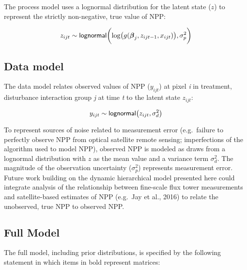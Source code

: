 \documentclass[
]{article}
\begin{document}
The process model uses a lognormal distribution for the latent state
(\(z\)) to represent the strictly non-negative, true value of NPP:

\[
z_{ijt} \sim {\sf lognormal} \biggl(\log \bigl( g(\boldsymbol{\beta}_j, z_{ijt-1}, x_{ijt})  \bigr)  , \sigma^{2}_{p} \biggr)
\]

\hypertarget{data-model}{%
\subsection{Data model}\label{data-model}}

The data model relates observed values of NPP (\(y_{ijt}\)) at pixel
\emph{i} in treatment, disturbance interaction group \emph{j} at time
\emph{t} to the latent state \(z_{ijt}\):

\[
y_{ijt} \sim {\sf lognormal} \bigl(z_{ijt}, \sigma^{2}_{d} \bigr)
\]

To represent sources of noise related to measurement error (e.g.~failure
to perfectly observe NPP from optical satellite remote sensing;
imperfections of the algorithm used to model NPP), observed NPP is
modeled as draws from a lognormal distribution with \(z\) as the mean
value and a variance term \(\sigma^{2}_{d}\). The magnitude of the
observation uncertainty (\(\sigma^{2}_{p}\)) represents measurement
error. Future work building on the dynamic hierarchical model presented
here could integrate analysis of the relationship between fine-scale
flux tower measurements and satellite-based estimates of NPP (e.g.~Jay
et al., 2016) to relate the unobserved, true NPP to observed NPP.

\hypertarget{full-model}{%
\subsection{Full Model}\label{full-model}}

The full model, including prior distributions, is specified by the
following statement in which items in bold represent matrices:
\end{document}
